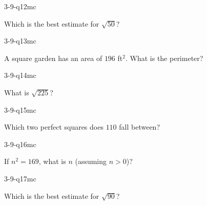 \begin{practiceQuestion}{3-9-q12}{mc}
\begin{questionText}
Which is the best estimate for $\sqrt{50}$?
\end{questionText}
\end{practiceQuestion}

\begin{practiceQuestion}{3-9-q13}{mc}
\begin{questionText}
A square garden has an area of $196$ ft$^2$. What is the perimeter?
\end{questionText}
\end{practiceQuestion}

\begin{practiceQuestion}{3-9-q14}{mc}
\begin{questionText}
What is $\sqrt{225}$?
\end{questionText}
\end{practiceQuestion}

\begin{practiceQuestion}{3-9-q15}{mc}
\begin{questionText}
Which two perfect squares does $110$ fall between?
\end{questionText}
\end{practiceQuestion}

\begin{practiceQuestion}{3-9-q16}{mc}
\begin{questionText}
If $n^2 = 169$, what is $n$ (assuming $n > 0$)?
\end{questionText}
\end{practiceQuestion}

\begin{practiceQuestion}{3-9-q17}{mc}
\begin{questionText}
Which is the best estimate for $\sqrt{90}$?
\end{questionText}
\end{practiceQuestion}

